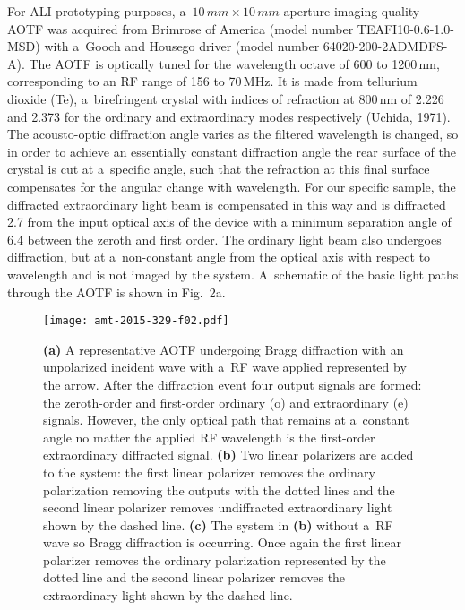 \documentclass[amt]{copernicus}
\begin{document}
For ALI prototyping purposes, a~$10\,\unit{mm} \times 10\,\unit{mm}$
aperture imaging quality AOTF was acquired from Brimrose of America
(model number TEAFI10-0.6-1.0-MSD) with a~Gooch and Housego driver
(model number 64020-200-2ADMDFS-A). The AOTF is optically tuned for
the wavelength octave of 600 to 1200\,\unit{nm}, corresponding to an
RF range of 156 to 70\,\unit{MHz}. It is made from tellurium dioxide
(Te), a~birefringent crystal with indices of refraction at
800\,\unit{nm} of 2.226 and 2.373 for the ordinary and extraordinary
modes respectively (Uchida, 1971). The acousto-optic diffraction angle varies as the filtered wavelength is changed, so in order to achieve an
essentially constant diffraction angle the rear surface of the crystal
is cut at a~specific angle, such that the refraction at this final
surface compensates for the angular change with wavelength. For our
specific sample, the diffracted extraordinary light beam is
compensated in this way and is diffracted 2.7{\degree} from the
input optical axis of the device with a minimum separation angle of 6.4{\degree} between the zeroth and first order. The ordinary light beam also
undergoes diffraction, but at a~non-constant angle from the optical
axis with respect to wavelength and is not imaged by the
system. A~schematic of the basic light paths through the AOTF is shown
in Fig.~2a.

\begin{figure}[t]
\texttt{[image: amt-2015-329-f02.pdf]}
\caption{\textbf{(a)} A representative AOTF undergoing Bragg diffraction with an
  unpolarized incident wave with a~RF wave applied represented by the
  arrow. After the diffraction event four output signals are formed:
  the zeroth-order and first-order ordinary (o) and extraordinary (e)
  signals. However, the only optical path that remains at a~constant
  angle no matter the applied RF wavelength is the first-order
  extraordinary diffracted signal. \textbf{(b)} Two linear polarizers
  are added to the system: the first linear polarizer removes the
  ordinary polarization removing the outputs with the dotted lines and
  the second linear polarizer removes undiffracted extraordinary light
  shown by the dashed line. \textbf{(c)} The system in \textbf{(b)}
  without a~RF wave so Bragg diffraction is occurring. Once again the
  first linear polarizer removes the ordinary polarization represented
  by the dotted line and the second linear polarizer removes the
  extraordinary light shown by the dashed line.}
\end{figure}
\end{document}
